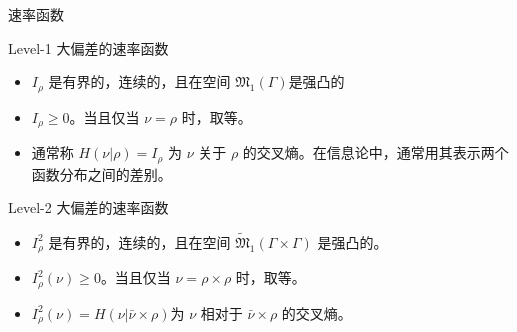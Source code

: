 \documentclass{beamer}
\begin{document}
	\begin{frame}{速率函数}
		\begin{block}{Level-1 大偏差的速率函数}
			\begin{itemize}
				\item $\mathit{I}_{\rho}$ 是有界的，连续的，且在空间 $\mathfrak{M}_1(\Gamma)$是强凸的
				\item $\mathit{I}_{\rho} \ge 0$。当且仅当 $\nu = \rho$ 时，取等。
				\item 通常称 $\mathit{H}(\nu | \rho) = \mathit{I}_{\rho}$ 为 $\nu$ 关于 $\rho$ 的交叉熵。在信息论中，通常用其表示两个函数分布之间的差别。
			\end{itemize}
		\end{block}

		\begin{block}{Level-2 大偏差的速率函数}
			\begin{itemize}
				\item $\mathit{I}^2_{\rho}$ 是有界的，连续的，且在空间 $\widetilde{\mathfrak{M}}_1(\Gamma \times \Gamma)$ 是强凸的。
				\item $\mathit{I}^2_{\rho}(\nu) \ge 0$。当且仅当 $\nu = \rho \times \rho$ 时，取等。
				\item $\mathit{I}_{\rho}^2(\nu) = \mathit{H}(\nu | \bar{\nu} \times \rho)$为 $\nu$ 相对于 $\bar{\nu} \times \rho$ 的交叉熵。
			\end{itemize}
		\end{block}
	\end{frame}

\end{document}
